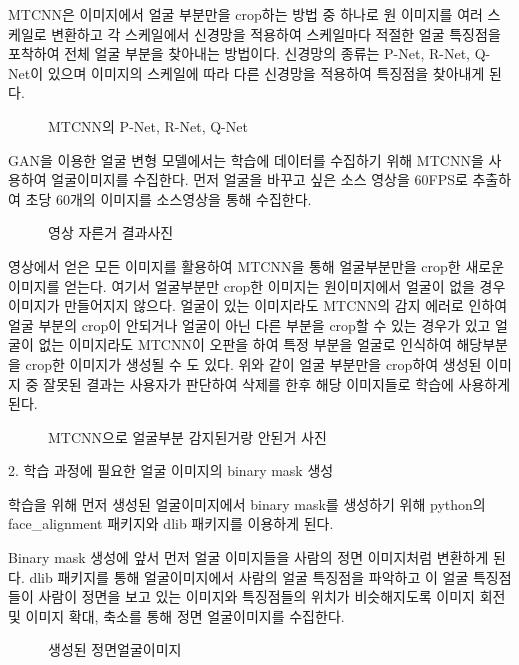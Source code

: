 \documentclass{oblivoir}
\begin{document}
MTCNN은 이미지에서 얼굴 부분만을 crop하는 방법 중 하나로 원 이미지를 여러 스케일로 변환하고 각 스케일에서 신경망을 적용하여 스케일마다 적절한 얼굴 특징점을 포착하여 전체 얼굴 부분을 찾아내는 방법이다. 신경망의 종류는 P-Net, R-Net, Q-Net이 있으며 이미지의 스케일에 따라 다른 신경망을 적용하여 특징점을 찾아내게 된다.

\begin{figure}[h!]
    \centering
\caption{MTCNN의 P-Net, R-Net, Q-Net}
\end{figure}


GAN을 이용한 얼굴 변형 모델에서는 학습에 데이터를 수집하기 위해 MTCNN을 사용하여 얼굴이미지를 수집한다. 먼저 얼굴을 바꾸고 싶은 소스 영상을 60FPS로 추출하여 초당 60개의 이미지를 소스영상을 통해 수집한다.

\begin{figure}[h!]%
    \centering
\caption{영상 자른거 결과사진}
\end{figure}


영상에서 얻은 모든 이미지를 활용하여 MTCNN을 통해 얼굴부분만을 crop한 새로운 이미지를 얻는다. 여기서 얼굴부분만 crop한 이미지는 원이미지에서 얼굴이 없을 경우 이미지가 만들어지지 않으다. 얼굴이 있는 이미지라도 MTCNN의 감지 에러로 인하여 얼굴 부분의 crop이 안되거나 얼굴이 아닌 다른 부분을 crop할 수 있는 경우가 있고 얼굴이 없는 이미지라도 MTCNN이 오판을 하여 특정 부분을 얼굴로 인식하여 해당부분을 crop한 이미지가 생성될 수 도 있다. 위와 같이 얼굴 부분만을 crop하여 생성된 이미지 중 잘못된 결과는 사용자가 판단하여 삭제를 한후 해당 이미지들로 학습에 사용하게 된다.

\begin{figure}[h!]%
    \centering
\caption{MTCNN으로 얼굴부분 감지된거랑 안된거 사진}
\end{figure}


2. 학습 과정에 필요한 얼굴 이미지의 binary mask 생성

학습을 위해 먼저 생성된 얼굴이미지에서 binary mask를 생성하기 위해 python의 face_alignment 패키지와 dlib 패키지를 이용하게 된다.

Binary mask 생성에 앞서 먼저 얼굴 이미지들을 사람의 정면 이미지처럼 변환하게 된다. dlib 패키지를 통해 얼굴이미지에서 사람의 얼굴 특징점을 파악하고 이 얼굴 특징점들이 사람이 정면을 보고 있는 이미지와 특징점들의 위치가 비슷해지도록 이미지 회전 및 이미지 확대, 축소를 통해 정면 얼굴이미지를 수집한다.
\begin{figure}[h!] %
    \centering
\caption{생성된 정면얼굴이미지}
\end{figure}
\end{document}
